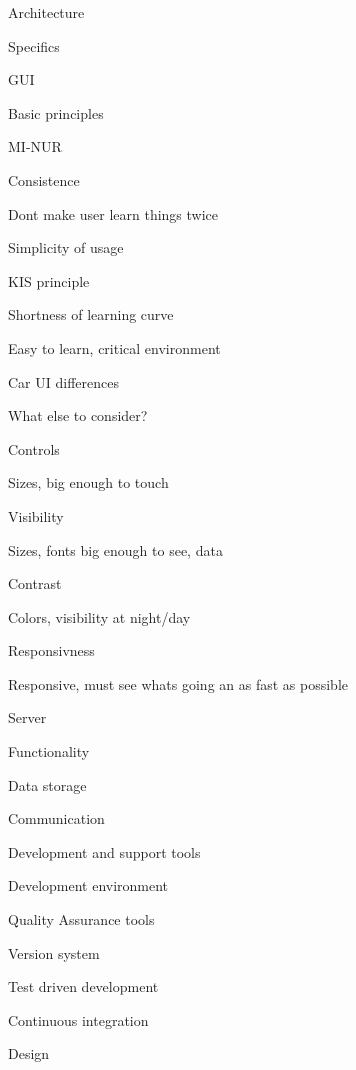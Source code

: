 \secc Architecture


\secc Specifics


\sec GUI


\secc Basic principles

MI-NUR           

\seccc Consistence

Dont make user learn things twice

\seccc Simplicity of usage

KIS principle

\seccc Shortness of learning curve

Easy to learn, critical environment

\secc Car UI differences

What else to consider?

\seccc Controls

Sizes, big enough to touch 

\seccc Visibility

Sizes, fonts big enough to see, data

\seccc Contrast

Colors, visibility at night/day

\seccc Responsivness

Responsive, must see whats going an as fast as possible


\sec Server


\secc Functionality


\secc Data storage


\secc Communication


\sec Development and support tools


\secc Development environment


\secc Quality Assurance tools


\secc Version system


\secc Test driven development


\secc Continuous integration



\chap Design


